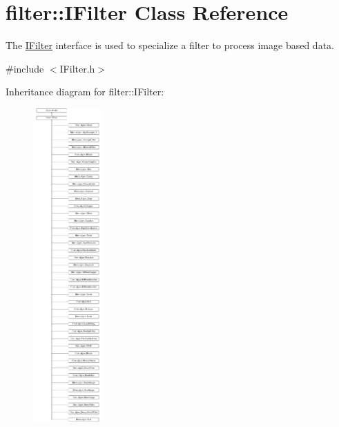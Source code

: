 \hypertarget{classfilter_1_1_i_filter}{}\section{filter\+:\+:I\+Filter Class Reference}
\label{classfilter_1_1_i_filter}


The \hyperlink{classfilter_1_1_i_filter}{I\+Filter} interface is used to specialize a filter to process image based data.  




{\ttfamily \#include $<$I\+Filter.\+h$>$}

Inheritance diagram for filter\+:\+:I\+Filter\+:\begin{figure}[H]
\begin{center}
\leavevmode
\includegraphics[height=12.000000cm]{d4/d8a/classfilter_1_1_i_filter}
\end{center}
\end{figure}

